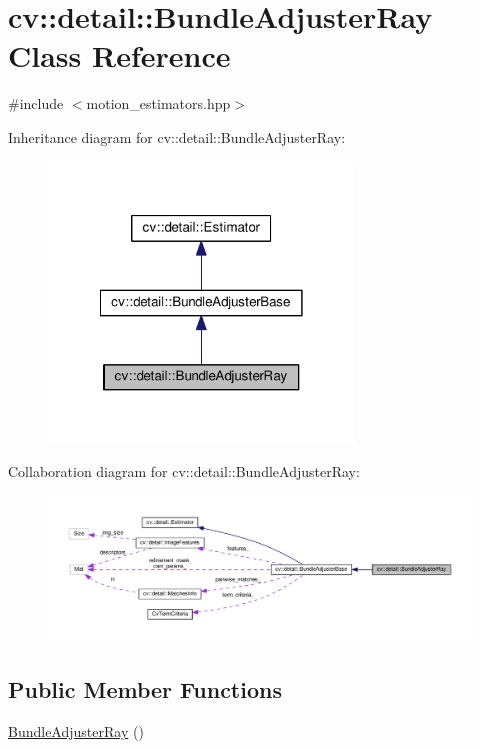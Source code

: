 \hypertarget{classcv_1_1detail_1_1BundleAdjusterRay}{\section{cv\-:\-:detail\-:\-:Bundle\-Adjuster\-Ray Class Reference}
\label{classcv_1_1detail_1_1BundleAdjusterRay}
}


{\ttfamily \#include $<$motion\-\_\-estimators.\-hpp$>$}



Inheritance diagram for cv\-:\-:detail\-:\-:Bundle\-Adjuster\-Ray\-:\nopagebreak
\begin{figure}[H]
\begin{center}
\leavevmode
\includegraphics[width=230pt]{classcv_1_1detail_1_1BundleAdjusterRay__inherit__graph}
\end{center}
\end{figure}


Collaboration diagram for cv\-:\-:detail\-:\-:Bundle\-Adjuster\-Ray\-:\nopagebreak
\begin{figure}[H]
\begin{center}
\leavevmode
\includegraphics[width=350pt]{classcv_1_1detail_1_1BundleAdjusterRay__coll__graph}
\end{center}
\end{figure}
\subsection*{Public Member Functions}
\begin{DoxyCompactItemize}
\item 
\hyperlink{classcv_1_1detail_1_1BundleAdjusterRay_ac295c09797a8034339e4a76791f6a24f}{Bundle\-Adjuster\-Ray} ()
\end{DoxyCompactItemize}

